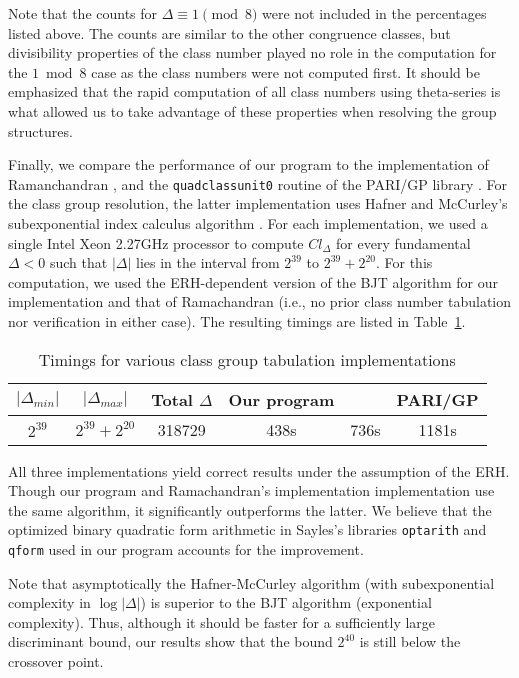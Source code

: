 \documentclass{mcom-l}
\theoremstyle{definition}
\begin{document}
Note that the counts for $\Delta \equiv 1 \pmod{8}$ were not included
in the percentages listed above.  The counts are similar to the other
congruence classes, but divisibility properties of the class number
played no role in the computation for the $1 \bmod 8$ case as the
class numbers were not computed first.  It should be emphasized that
the rapid computation of all class numbers using theta-series is what
allowed us to take advantage of these properties when resolving the
group structures.

Finally, we compare the performance of our program to the
implementation of Ramanchandran \cite{ramachandran}, and the
\texttt{quadclassunit0} routine of the PARI/GP library
\cite{pari}. For the class group resolution, the latter implementation
uses Hafner and McCurley's subexponential index calculus algorithm
\cite{mccurley,hafner}. For each implementation, we used a single
Intel Xeon 2.27GHz processor to compute $Cl_\Delta$ for every
fundamental $\Delta < 0$ such that $|\Delta|$ lies in the interval
from $2^{39}$ to $2^{39} + 2^{20}$.  For this computation, we used the
ERH-dependent version of the BJT algorithm for our implementation and
that of Ramachandran (i.e., no prior class number tabulation nor
verification in either case).  The resulting timings are listed in
Table~\ref{tab:comparison}.
\begin{table}[htb]
\centering
\caption{Timings for various class group tabulation implementations}
\label{tab:comparison}
\begin{tabular}{| c | c | c || c | c | c |}
\hline
$|\Delta_{min}|$ & $|\Delta_{max}|$ & Total $\Delta$ & Our program & \cite{ramachandran} & PARI/GP\\
\hline
\hline
$2^{39}$ & $2^{39} + 2^{20}$ & 318729 & 438s & 736s & 1181s\\
\hline
\end{tabular}
\end{table}

All three implementations yield correct results under the assumption
of the ERH. Though our program and Ramachandran's implementation
implementation use the same algorithm, 
it significantly outperforms the latter. We
believe that the optimized binary quadratic form arithmetic in Sayles's
libraries \texttt{optarith} and \texttt{qform} \cite{sayles1,sayles2}
used in our program accounts for the improvement.  

Note that asymptotically the Hafner-McCurley algorithm (with
subexponential complexity in $\log |\Delta|$) is superior to the BJT
algorithm (exponential complexity).  Thus, although it should be faster for a
sufficiently large discriminant bound, our results show that the bound
$2^{40}$ is still below the crossover point.
\end{document}
